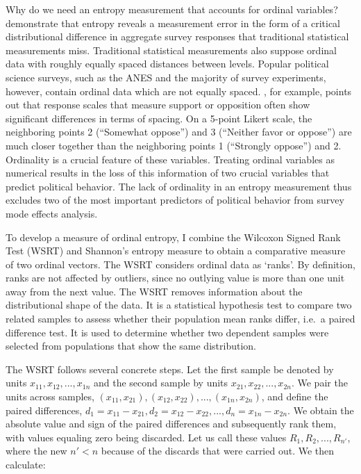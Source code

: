 \documentclass[12pt,]{article}
\begin{document}
Why do we need an entropy measurement that accounts for ordinal
variables? \citet{homola_2016_measure} demonstrate that entropy reveals
a measurement error in the form of a critical distributional difference
in aggregate survey responses that traditional statistical measurements
miss. Traditional statistical measurements also suppose ordinal data
with roughly equally spaced distances between levels. Popular political
science surveys, such as the ANES and the majority of survey
experiments, however, contain ordinal data which are not equally spaced.
\citet{johns_2005_size}, for example, points out that response scales
that measure support or opposition often show significant differences in
terms of spacing. On a 5-point Likert scale, the neighboring points 2
(``Somewhat oppose'') and 3 (``Neither favor or oppose'') are much
closer together than the neighboring points 1 (``Strongly oppose'') and
2. Ordinality is a crucial feature of these variables. Treating ordinal
variables as numerical results in the loss of this information of two
crucial variables that predict political behavior. The lack of
ordinality in an entropy measurement thus excludes two of the most
important predictors of political behavior from survey mode effects
analysis.

To develop a measure of ordinal entropy, I combine the Wilcoxon Signed
Rank Test (WSRT) and Shannon's entropy measure to obtain a comparative
measure of two ordinal vectors. The WSRT considers ordinal data as
`ranks'. By definition, ranks are not affected by outliers, since no
outlying value is more than one unit away from the next value. The WSRT
removes information about the distributional shape of the data. It is a
statistical hypothesis test to compare two related samples to assess
whether their population mean ranks differ, i.e.~a paired difference
test. It is used to determine whether two dependent samples were
selected from populations that show the same distribution.

The WSRT follows several concrete steps. Let the first sample be denoted
by units \(x_{11}, x_{12}, ..., x_{1n}\) and the second sample by units
\(x_{21}, x_{22}, ..., x_{2n}\). We pair the units across samples,
\((x_{11}, x_{21}), (x_{12}, x_{22}), ..., (x_{1n}, x_{2n})\), and
define the paired differences,
\(d_1 = x_{11} - x_{21}, d_2 = x_{12} - x_{22}, ..., d_n = x_{1n} - x_{2n}\).
We obtain the absolute value and sign of the paired differences and
subsequently rank them, with values equaling zero being discarded. Let
us call these values \(R_1, R_2, ..., R_{n'}\), where the new \(n' < n\)
because of the discards that were carried out. We then calculate:
\end{document}
